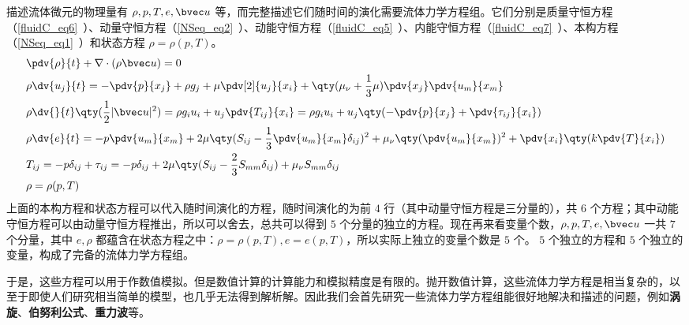 

描述流体微元的物理量有 $\rho,p,T,e,\bvec u$ 等，而完整描述它们随时间的演化需要流体力学方程组。它们分别是质量守恒方程（\autoref{fluidC_eq6}~）、动量守恒方程（\autoref{NSeq_eq2}~）、动能守恒方程（\autoref{fluidC_eq5}~）、内能守恒方程（\autoref{fluidC_eq7}~）、本构方程（\autoref{NSeq_eq1}~）和状态方程 $\rho=\rho(p,T)$。
\begin{equation}
\begin{aligned}
&\pdv{\rho}{t}+\nabla\cdot(\rho\bvec u)=0\\
&
\rho \dv{u_j}{t}=-\pdv{p}{x_j}+\rho g_j+\mu\pdv[2]{u_j}{x_i} +\qty(\mu_\nu+\frac{1}{3}\mu)\pdv{x_j}\pdv{u_m}{x_m}\\
&\rho \dv{}{t}\qty(\frac{1}{2}|\bvec u|^2)=\rho g_iu_i+u_j\pdv{T_{ij}}{x_i}=\rho g_iu_i+u_j\qty(-\pdv{p}{x_j}+\pdv{\tau_{ij}}{x_i})\\
&\rho \dv{e}{t}=-p\pdv{u_m}{x_m}+2\mu\qty(S_{ij}-\frac{1}{3}\pdv{u_m}{x_m}\delta_{ij})^2+\mu_\nu\qty(\pdv{u_m}{x_m})^2+\pdv{x_i}\qty(k\pdv{T}{x_i})
\\
&T_{ij}=-p\delta_{ij}+\tau_{ij}=-p\delta_{ij}+2\mu \qty(S_{ij}-\frac{2}{3}S_{mm}\delta_{ij})+\mu_\nu S_{mm} \delta_{ij}\\
&\rho=\rho(p,T)
\end{aligned}
\end{equation}
上面的本构方程和状态方程可以代入随时间演化的方程，随时间演化的为前 $4$ 行（其中动量守恒方程是三分量的），共 $6$ 个方程；其中动能守恒方程可以由动量守恒方程推出，所以可以舍去，总共可以得到 $5$ 个分量的独立的方程。现在再来看变量个数，$\rho,p,T,e,\bvec u$ 一共 $7$ 个分量，其中 $e,\rho$ 都蕴含在状态方程之中：$\rho=\rho(p,T),e=e(p,T)$，所以实际上独立的变量个数是 $5$ 个。 $5$ 个独立的方程和 $5$ 个独立的变量，构成了完备的流体力学方程组。

于是，这些方程可以用于作数值模拟。但是数值计算的计算能力和模拟精度是有限的。抛开数值计算，这些流体力学方程是相当复杂的，以至于即使人们研究相当简单的模型，也几乎无法得到解析解。因此我们会首先研究一些流体力学方程组能很好地解决和描述的问题，例如\textbf{涡旋}、\textbf{伯努利公式}、\textbf{重力波}等。
